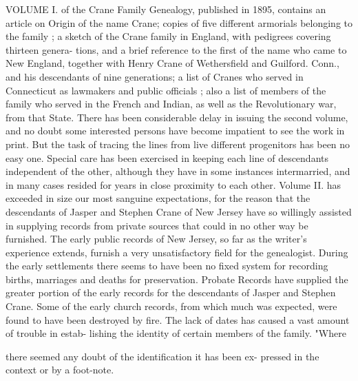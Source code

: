 \documentclass{book}
\begin{document}
VOLUME I. of the Crane Family Genealogy, published in 1895,
contains an article on Origin of the name Crane; copies of
five different armorials belonging to the family ; a sketch of the
Crane family in England, with pedigrees covering thirteen genera-
tions, and a brief reference to the first of the name who came to
New England, together with Henry Crane of Wethersfield and
Guilford. Conn., and his descendants of nine generations; a list
of Cranes who served in Connecticut as lawmakers and public
officials ; also a list of members of the family who served in the
French and Indian, as well as the Revolutionary war, from
that State. There has been considerable delay in issuing the
second volume, and no doubt some interested persons have
become impatient to see the work in print. But the task
of tracing the lines from live different progenitors has been
no easy one. Special care has been exercised in keeping each
line of descendants independent of the other, although they
have in some instances intermarried, and in many cases resided
for years in close proximity to each other. Volume II. has
exceeded in size our most sanguine expectations, for the
reason that the descendants of Jasper and Stephen Crane of
New Jersey have so willingly assisted in supplying records
from private sources that could in no other way be furnished.
The early public records of New Jersey, so far as the writer's
experience extends, furnish a very unsatisfactory field for the
genealogist. During the early settlements there seems to have
been no fixed system for recording births, marriages and deaths
for preservation. Probate Records have supplied the greater
portion of the early records for the descendants of Jasper and
Stephen Crane. Some of the early church records, from which
much was expected, were found to have been destroyed by fire.
The lack of dates has caused a vast amount of trouble in estab-
lishing the identity of certain members of the family. "Where



there seemed any doubt of the identification it has been ex-
pressed in the context or by a foot-note.
\end{document}
